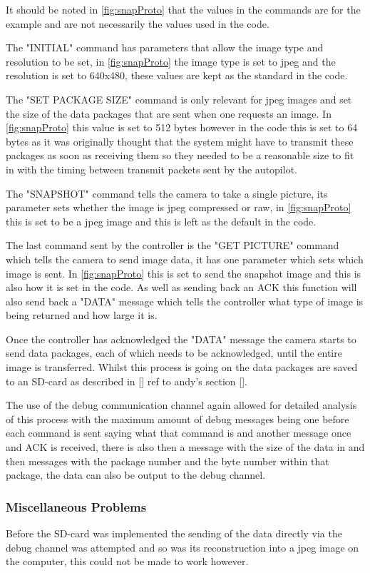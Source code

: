 It should be noted in \ref{fig:snapProto} that the values in the commands are for the example and are not necessarily the values used in the code.

The "INITIAL" command has parameters that allow the image type and resolution to be set, in \ref{fig:snapProto} the image type is set to jpeg and the resolution is set to 640x480, these values are kept as the standard in the code.

The "SET PACKAGE SIZE" command is only relevant for jpeg images and set the size of the data packages that are sent when one requests an image. In \ref{fig:snapProto} this value is set to 512 bytes however in the code this is set to 64 bytes as it was originally thought that the system might have to transmit these packages as soon as receiving them so they needed to be a reasonable size to fit in with the timing between transmit packets sent by the autopilot.

The "SNAPSHOT" command tells the camera to take a single picture, its parameter sets whether the image is jpeg compressed or raw, in \ref{fig:snapProto} this is set to be a jpeg image and this is left as the default in the code.

The last command sent by the controller is the "GET PICTURE" command which tells the camera to send image data, it has one parameter which sets which image is sent. In \ref{fig:snapProto} this is set to send the snapshot image and this is also how it is set in the code. As well as sending back an ACK this function will also send back a "DATA" message which tells the controller what type of image is being returned and how large it is.

Once the controller has acknowledged the "DATA" message the camera starts to send data packages, each of which needs to be acknowledged, until the entire image is transferred. Whilst this process is going on the data packages are saved to an SD-card as described in [] ref to andy's section [].

The use of the debug communication channel again allowed for detailed analysis of this process with the maximum amount of debug messages being one before each command is sent saying what that command is and another message once and ACK is received, there is also then a message with the size of the data in and then messages with the package number and the byte number within that package, the data can also be output to the debug channel.

\subsubsection{Miscellaneous Problems}

Before the SD-card was implemented the sending of the data directly via the debug channel was attempted and so was its reconstruction into a jpeg image on the computer, this could not be made to work however.